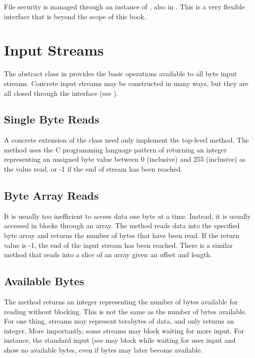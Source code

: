 File security is managed through an instance of
, also in .  This is a very
flexible interface that is beyond the scope of this book.




\section{Input Streams}

The abstract class  in  provides the
basic operations available to all byte input streams.  Concrete
input streams may be constructed in many ways, but they are all closed
through the  interface (see ).

\subsection{Single Byte Reads}

A concrete extension of the  class need only
implement the top-level  method.  The 
method uses the C programming language pattern of returning an integer
representing an unsigned byte value between 0 (inclusive) and 255
(inclusive) as the value read, or -1 if the end of stream has been
reached.

\subsection{Byte Array Reads}

It is usually too inefficient to access data one byte at a time.
Instead, it is usually accessed in blocks through an array.  The
 method reads data into the specified byte array
and returns the number of bytes that have been read.  If the return
value is -1, the end of the input stream has been reached.  There is a
similar method that reads into a slice of an array given an offset
and length.

\subsection{Available Bytes}

The method  returns an integer representing the
number of bytes available for reading without blocking.  This is not
the same as the number of bytes available.  For one thing, streams may
represent terabytes of data, and  only returns an
integer.  More importantly, some streams may block waiting for more
input.  For instance, the standard input (see  may
block while waiting for user input and show no available bytes, even
if bytes may later become available.  

